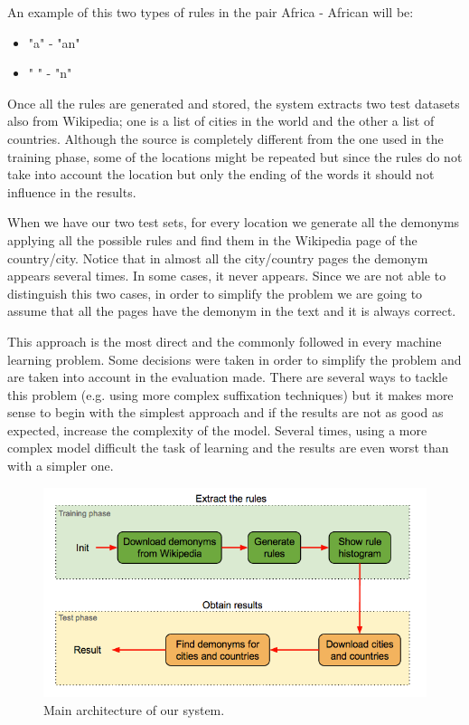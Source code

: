 \documentclass[]{article}
\begin{document}
An example of this two types of rules in the pair Africa - African will be:
\begin{itemize}
\item "a" - "an"
\item " " - "n"
\end{itemize}

Once all the rules are generated and stored, the system extracts two test datasets also from Wikipedia; one is a list of cities in the world and the other a list of countries. Although the source is completely different from the one used in the training phase, some of the locations might be repeated but since the rules do not take into account the location but only the ending of the words it should not influence in the results.

When we have our two test sets, for every location we generate all the demonyms applying all the possible rules and find them in the Wikipedia page of the country/city. Notice that in almost all the city/country pages the demonym appears several times. In some cases, it never appears. Since we are not able to distinguish this two cases, in order to simplify the problem we are going to assume that all the pages have the demonym in the text and it is always correct. 


This approach is the most direct and the commonly followed in every machine learning problem. Some decisions were taken in order to simplify the problem and are taken into account in the evaluation made. There are several ways to tackle this problem (e.g. using more complex suffixation techniques) but it makes more sense to begin with the simplest approach and if the results are not as good as expected, increase the complexity of the model. Several times, using a more complex model difficult the task of learning and the results are even worst than with a simpler one.

\begin{figure}[htb!]
\centering
\includegraphics[scale=0.5]{img/architecture}
\caption{Main architecture of our system.}
\label{Main architecture of our system.}
\end{figure}
\end{document}
